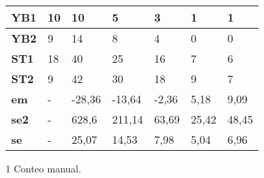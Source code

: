 \begin{table}[]
\begin{threeparttable}[b]
\begin{tabular}{l|l|lllll|}
            \multicolumn{1}{|l|}{\textbf{YB1}}   & 10          & \multicolumn{1}{l|}{10}     & \multicolumn{1}{l|}{5}      & \multicolumn{1}{l|}{3}     & \multicolumn{1}{l|}{1}     & 1     \\ \hline
            \multicolumn{1}{|l|}{\textbf{YB2}}   & 9           & \multicolumn{1}{l|}{14}     & \multicolumn{1}{l|}{8}      & \multicolumn{1}{l|}{4}     & \multicolumn{1}{l|}{0}     & 0     \\ \hline
            \multicolumn{1}{|l|}{\textbf{ST1}}   & 18          & \multicolumn{1}{l|}{40}     & \multicolumn{1}{l|}{25}     & \multicolumn{1}{l|}{16}    & \multicolumn{1}{l|}{7}     & 6     \\ \hline
            \multicolumn{1}{|l|}{\textbf{ST2}}   & 9           & \multicolumn{1}{l|}{42}     & \multicolumn{1}{l|}{30}     & \multicolumn{1}{l|}{18}    & \multicolumn{1}{l|}{9}     & 7     \\ \hline
            \multicolumn{1}{|l|}{\textbf{em}}    & -           & \multicolumn{1}{l|}{-28,36} & \multicolumn{1}{l|}{-13,64} & \multicolumn{1}{l|}{-2,36} & \multicolumn{1}{l|}{5,18}  & 9,09  \\ \hline
            \multicolumn{1}{|l|}{\textbf{se2}}   & -           & \multicolumn{1}{l|}{628,6}  & \multicolumn{1}{l|}{211,14} & \multicolumn{1}{l|}{63,69} & \multicolumn{1}{l|}{25,42} & 48,45 \\ \hline
            \multicolumn{1}{|l|}{\textbf{se}}    & -           & \multicolumn{1}{l|}{25,07}  & \multicolumn{1}{l|}{14,53}  & \multicolumn{1}{l|}{7,98}  & \multicolumn{1}{l|}{5,04}  & 6,96  \\ \hline
        \end{tabular}
        \begin{tablenotes}
       \item [1]Conteo manual.
     \end{tablenotes}
  \end{threeparttable}
\end{table}